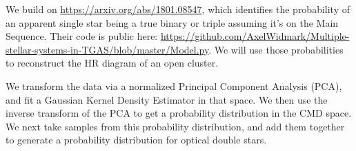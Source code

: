 \documentclass{article}
\begin{document}
We build on \url{https://arxiv.org/abs/1801.08547}, which identifies the probability of an apparent single star being a true binary or triple assuming it's on the Main Sequence.
Their code is public here: \url{https://github.com/AxelWidmark/Multiple-stellar-systems-in-TGAS/blob/master/Model.py}.
We will use those probabilities to reconstruct the HR diagram of an open cluster.

We transform the data via a normalized Principal Component Analysis (PCA), and fit a Gaussian Kernel Density Estimator in that space. We then use the inverse transform of the PCA to get a probability distribution in the CMD space. We next take samples from this probability distribution, and add them together to generate a probability distribution for optical double stars. 
\end{document}
